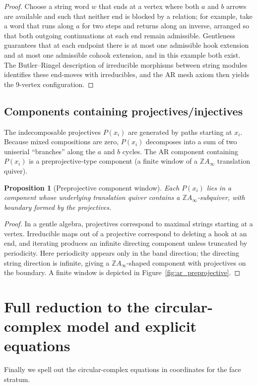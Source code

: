\documentclass[11pt,oneside]{amsbook}
\numberwithin{equation}{section}
\theoremstyle{plain}
\newtheorem{proposition}[theorem]{Proposition}
\theoremstyle{definition}
\theoremstyle{remark}
\begin{document}
\begin{proof}
Choose a string word $w$ that ends at a vertex where both $a$ and $b$ arrows are available and such that neither end is blocked by a relation;
for example, take a word that runs along $a$ for two steps and returns along an inverse, arranged so that both outgoing continuations at each end remain admissible.
Gentleness guarantees that at each endpoint there is at most one admissible hook extension and at most one admissible cohook extension, and in this example both exist.
The Butler--Ringel description of irreducible morphisms between string modules identifies these end-moves with irreducibles,
and the AR mesh axiom then yields the 9-vertex configuration.
\end{proof}

\subsection{Components containing projectives/injectives}
The indecomposable projectives $P(x_i)$ are generated by paths starting at $x_i$.
Because mixed compositions are zero, $P(x_i)$ decomposes into a sum of two uniserial ``branches'' along the $a$ and $b$ cycles.
The AR component containing $P(x_i)$ is a preprojective-type component (a finite window of a $\mathbb Z A_\infty$ translation quiver).

\begin{proposition}[Preprojective component window]
\label{prop:torus_preproj}
Each $P(x_i)$ lies in a component whose underlying translation quiver contains a $\mathbb Z A_\infty$-subquiver,
with boundary formed by the projectives.
\end{proposition}

\begin{proof}
In a gentle algebra, projectives correspond to maximal strings starting at a vertex.
Irreducible maps out of a projective correspond to deleting a hook at an end, and iterating produces an infinite directing component unless truncated by periodicity.
Here periodicity appears only in the band direction; the directing string direction is infinite, giving a $\mathbb Z A_\infty$-shaped component with projectives on the boundary.
A finite window is depicted in Figure~\ref{fig:ar_preprojective}.
\end{proof}

\section{Full reduction to the circular-complex model and explicit equations}
Finally we spell out the circular-complex equations in coordinates for the face stratum.
\end{document}
